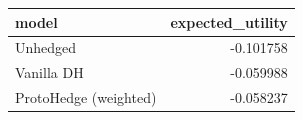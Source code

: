 \begin{tabular}{lr}
\toprule
model & expected_utility \\
\midrule
Unhedged & -0.101758 \\
Vanilla DH & -0.059988 \\
ProtoHedge (weighted) & -0.058237 \\
\bottomrule
\end{tabular}
